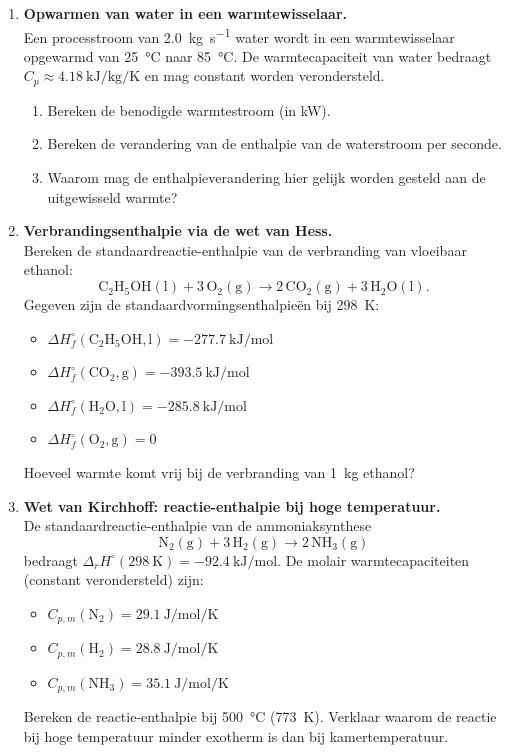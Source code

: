 \begin{enumerate}
\item \textbf{Opwarmen van water in een warmtewisselaar.} \\
Een processtroom van \SI{2.0}{\kilogram\per\second} water wordt in een warmtewisselaar opgewarmd van \SI{25}{\celsius} naar \SI{85}{\celsius}. De warmtecapaciteit van water bedraagt $C_p \approx \SI{4.18}{\kilo\joule\per\kilogram\per\kelvin}$ en mag constant worden verondersteld.
\begin{enumerate}
\item[(a)] Bereken de benodigde warmtestroom (in \si{\kilo\watt}).
\item[(b)] Bereken de verandering van de enthalpie van de waterstroom per seconde.
\item[(c)] Waarom mag de enthalpieverandering hier gelijk worden gesteld aan de uitgewisseld warmte?
\end{enumerate}

\item \textbf{Verbrandingsenthalpie via de wet van Hess.} \\
Bereken de standaardreactie-enthalpie van de verbranding van vloeibaar ethanol:
\[
\mathrm{C_2H_5OH(l) + 3\,O_2(g) \rightarrow 2\,CO_2(g) + 3\,H_2O(l)}.
\]
Gegeven zijn de standaardvormingsenthalpie\"en bij \SI{298}{\kelvin}:
\begin{itemize}
\item $\Delta H_f^\circ(\mathrm{C_2H_5OH,l}) = \SI{-277.7}{\kilo\joule\per\mole}$
\item $\Delta H_f^\circ(\mathrm{CO_2,g}) = \SI{-393.5}{\kilo\joule\per\mole}$
\item $\Delta H_f^\circ(\mathrm{H_2O,l}) = \SI{-285.8}{\kilo\joule\per\mole}$
\item $\Delta H_f^\circ(\mathrm{O_2,g}) = 0$
\end{itemize}
Hoeveel warmte komt vrij bij de verbranding van \SI{1}{\kilogram} ethanol?

\item \textbf{Wet van Kirchhoff: reactie-enthalpie bij hoge temperatuur.} \\
De standaardreactie-enthalpie van de ammoniaksynthese
\[
\mathrm{N_2(g) + 3\,H_2(g) \rightarrow 2\,NH_3(g)}
\]
bedraagt $\Delta_r H^\circ(\SI{298}{\kelvin}) = \SI{-92.4}{\kilo\joule\per\mole}$. De molair warmtecapaciteiten (constant verondersteld) zijn:
\begin{itemize}
\item $C_{p,m}(\mathrm{N_2}) = \SI{29.1}{\joule\per\mole\per\kelvin}$
\item $C_{p,m}(\mathrm{H_2}) = \SI{28.8}{\joule\per\mole\per\kelvin}$
\item $C_{p,m}(\mathrm{NH_3}) = \SI{35.1}{\joule\per\mole\per\kelvin}$
\end{itemize}
Bereken de reactie-enthalpie bij \SI{500}{\celsius} (\SI{773}{\kelvin}). Verklaar waarom de reactie bij hoge temperatuur minder exotherm is dan bij kamertemperatuur.


\end{enumerate}
